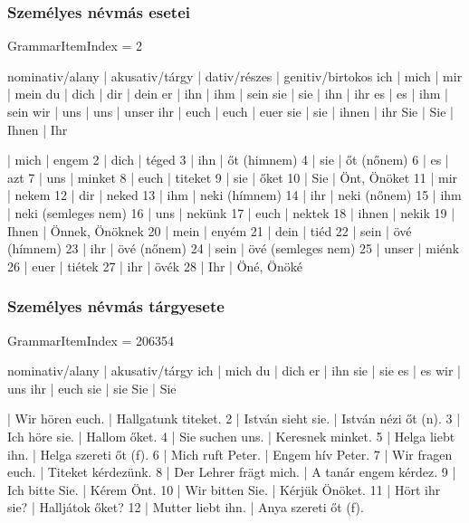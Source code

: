 \documentclass{article}
\newenvironment{desc}{\verbatim}{\endverbatim}
\newenvironment{exmp}{\verbatim}{\endverbatim}
\begin{document}
\subsubsection{Személyes névmás esetei}

GrammarItemIndex = 2

\begin{desc}
nominativ/alany | akusativ/tárgy | dativ/részes | genitiv/birtokos
ich             | mich           | mir          | mein
du              | dich           | dir          | dein 
er              | ihn            | ihm          | sein
sie             | sie            | ihn          | ihr
es              | es             | ihm          | sein
wir             | uns            | uns          | unser
ihr             | euch           | euch         | euer
sie             | sie            | ihnen        | ihr
Sie             | Sie            | Ihnen        | Ihr 
\end{desc}

\begin{exmp}
1 | mich | engem
2 | dich | téged
3 | ihn | őt (himnem)
4 | sie | őt (nőnem)
6 | es | azt
7 | uns | minket
8 | euch | titeket
9 | sie | őket
10 | Sie | Önt, Önöket
11 | mir | nekem
12 | dir | neked
13 | ihm | neki (hímnem)
14 | ihr | neki (nőnem)
15 | ihm | neki (semleges nem)
16 | uns | nekünk
17 | euch | nektek
18 | ihnen | nekik
19 | Ihnen | Önnek, Önöknek
20 | mein | enyém
21 | dein | tiéd
22 | sein | övé (hímnem)
23 | ihr | övé (nőnem)
24 | sein | övé (semleges nem)
25 | unser | miénk
26 | euer | tiétek
27 | ihr | övék
28 | Ihr | Öné, Önöké
\end{exmp}

\subsubsection{Személyes névmás tárgyesete}

GrammarItemIndex = 206354

\begin{desc}
nominativ/alany | akusativ/tárgy
ich             | mich
du              | dich
er              | ihn
sie             | sie
es              | es
wir             | uns
ihr             | euch
sie             | sie
Sie             | Sie
\end{desc}

\begin{exmp}
1 | Wir hören euch. | Hallgatunk titeket.
2 | István sieht sie. | István nézi őt (n).
3 | Ich höre sie. | Hallom őket.
4 | Sie suchen uns. | Keresnek minket.
5 | Helga liebt ihn. | Helga szereti őt (f).
6 | Mich ruft Peter. | Engem hív Peter.
7 | Wir fragen euch. | Titeket kérdezünk.
8 | Der Lehrer frägt mich. | A tanár engem kérdez.
9 | Ich bitte Sie. | Kérem Önt.
10 | Wir bitten Sie. | Kérjük Önöket.
11 | Hört ihr sie? | Halljátok őket?
12 | Mutter liebt ihn. | Anya szereti őt (f).
\end{exmp}
\end{document}
